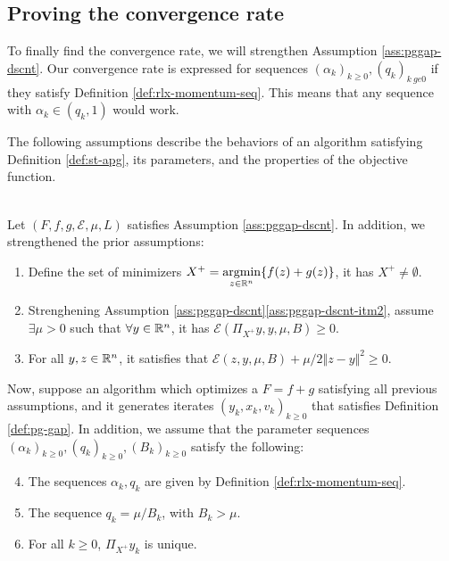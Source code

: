 \documentclass[12pt]{article}
\begin{document}
    \subsection{Proving the convergence rate}
        To finally find the convergence rate, we will strengthen Assumption \ref{ass:pggap-dscnt}. 
        Our convergence rate is expressed for sequences $(\alpha_k)_{k \ge 0}, (q_k)_{k \ ge 0}$ if they satisfy Definition \ref{def:rlx-momentum-seq}. 
        This means that any sequence with $\alpha_k \in (q_k, 1)$ would work. 
        \par
        The following assumptions describe the behaviors of an algorithm satisfying Definition \ref{def:st-apg}, its parameters, and the properties of the objective function. 
        \begin{assumption}\;\label{ass:lin-cnvg}\\
            Let $(F, f, g, \mathcal E, \mu, L)$ satisfies Assumption \ref{ass:pggap-dscnt}. 
            In addition, we strengthened the prior assumptions:
            \begin{enumerate}[nosep]
                \item Define the set of minimizers $X^+ = \mathop{\rm argmin}\limits_{z\in \mathbb R^n}\{ f(z) + g(z)\}$, it has $X^+ \neq \emptyset$. 
                \item Strenghening Assumption \ref{ass:pggap-dscnt}\ref{ass:pggap-dscnt-itm2}, assume $\exists \mu > 0$ such that $\forall y \in \mathbb R^n$, it has $\mathcal E \left(\Pi_{X^+}y, y, \mu, B\right) \ge 0$. 
                \item For all $y, z \in \mathbb R^n$, it satisfies that $\mathcal E(z, y, \mu, B) + \mu/2 \Vert z - y\Vert^2 \ge 0$. 
            \end{enumerate}
            Now, suppose an algorithm which optimizes a $F = f + g$ satisfying all previous assumptions, and it generates iterates $(y_k, x_k, v_k)_{k\ge 0}$ that satisfies Definition \ref{def:pg-gap}. 
            In addition, we assume that the parameter sequences $(\alpha_k)_{k \ge 0},(q_k)_{k \ge 0}, (B_k)_{k \ge 0}$ satisfy the following: 
            \begin{enumerate}[nosep]\setcounter{enumi}{3}
                \item The sequences $\alpha_k, q_k$ are given by Definition \ref{def:rlx-momentum-seq}. 
                \item The sequence $q_k = \mu/B_k$, with $B_k > \mu$. 
                \item For all $k \ge 0$, $\Pi_{X^+}y_k$ is unique. 
            \end{enumerate}
        \end{assumption}
\end{document}
